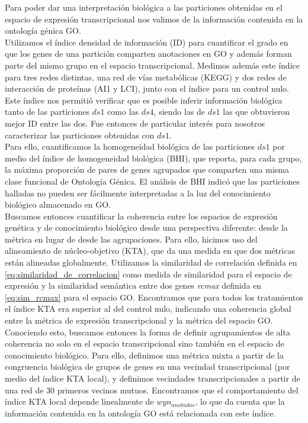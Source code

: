Para poder dar una interpretación biológica a las particiones obtenidas en el espacio de expresión transcripcional nos valimos de la información contenida en la ontología génica GO.\\
Utilizamos el índice densidad de información (ID) para cuantificar el grado en que los genes de una partición comparten anotaciones en GO y además forman parte del mismo grupo en el espacio transcripcional. Medimos además este índice para tres redes distintas, una red de vías metabólicas (KEGG) y dos redes de interacción de proteínas (AI1 y LCI), junto con el índice para un control nulo. Este índice nos permitió verificar que es posible inferir información biológica tanto de las particiones $ds1$ como las $ds4$, siendo las de $ds1$ las que obtuvieron mejor ID entre las dos. Fue entonces de particular interés para nosotros caracterizar las particiones obtenidas con $ds1$.\\
Para ello, cuantificamos la homogeneidad biológica de las particiones $ds1$ por medio del índice de homogeneidad biológica (BHI), que reporta, para cada grupo, la máxima proporción de pares de genes agrupados que comparten una misma clase funcional de Ontología Génica. El análisis de BHI indicó que las particiones halladas no pueden ser fácilmente interpretadas a la luz del conocimiento biológico almacenado en GO.\\
Buscamos entonces cuantificar la coherencia entre los espacios de expresión genética y de conocimiento biológico desde una perspectiva diferente: desde la métrica en lugar de desde las agrupaciones. Para ello, hicimos uso del alineamiento de núcleo-objetivo (KTA), que da una medida en que dos métricas están alineadas globalmente. Utilizamos la similaridad de correlación definida en \ref{eq:similaridad_de_correlacion} como medida de similaridad para el espacio de expresión y la similaridad semántica entre dos genes \textit{rcmax} definida en \ref{eq:sim_rcmax} para el espacio GO. Encontramos que para todos los tratamientos el índice KTA era superior al del control nulo, indicando una coherencia global entre la métrica de expresión transcripcional y la métrica del espacio GO.\\
Conociendo esto, buscamos entonces la forma de definir agrupamientos de alta coherencia no solo en el espacio transcripcional sino también en el espacio de conocimiento biológico. Para ello, definimos una métrica mixta a partir de la congruencia biológica de grupos de genes en una vecindad transcripcional (por medio del índice KTA local), y definimos vecindades transcripcionales a partir de una red de 30 primeros vecinos mutuos. Encontramos que el comportamiento del índice KTA local depende linealmente de $wyn_{anotados}$, lo que da cuenta que la información contenida en la ontología GO está relacionada con este índice.\\
